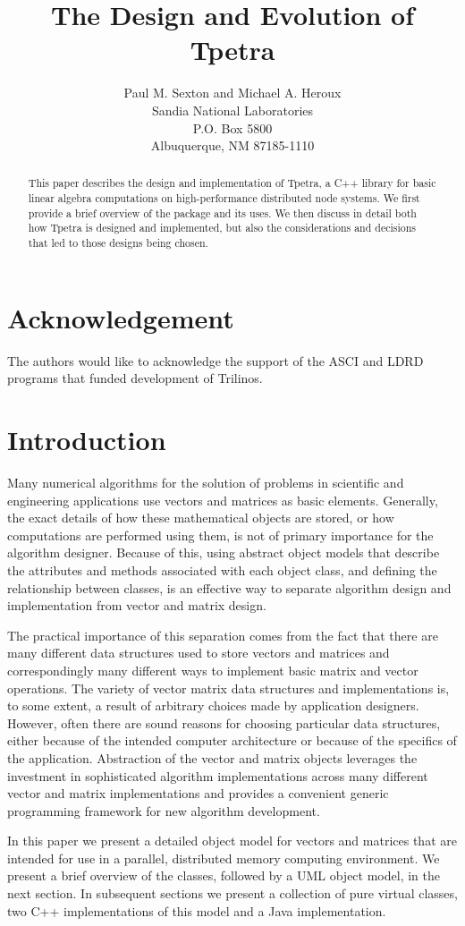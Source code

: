 \documentclass[10pt,relax]{TpetraDesign}
\title{The Design and Evolution of Tpetra}
\author{Paul M. Sexton and Michael A. Heroux \\
       Sandia National Laboratories\\
       P.O. Box 5800\\
       Albuquerque, NM 87185-1110
     }
\date{}
\begin{document}
\maketitle

\begin{abstract}
This paper describes the design and implementation of Tpetra,
a C++ library for basic linear algebra computations on high-performance
distributed node systems. We first provide a brief overview of
the package and its uses. We then discuss in detail both how
Tpetra is designed and implemented, but also the considerations
and decisions that led to those designs being chosen.
\end{abstract}

\clearpage
\section*{Acknowledgement}
The authors would like to acknowledge the support of the ASCI and LDRD programs
that funded development of Trilinos.

\newpage

\section{Introduction}


Many numerical algorithms for the solution of problems in
scientific and engineering applications use vectors and
matrices as basic elements.   Generally, the exact details
of how these mathematical objects are stored, or how computations
are performed using them, is not of primary importance for the
algorithm designer.  Because of this, using abstract object models
that describe the attributes and methods associated with each
object class, and defining the relationship between classes, is an
effective way to separate algorithm design and implementation from
vector and matrix design.

The practical importance of this separation comes from the fact
that there are many different data structures used to store
vectors and matrices and correspondingly many different ways
to implement basic matrix and vector operations.  The variety
of vector matrix data structures and implementations is, to
some extent, a result of arbitrary choices made by application
designers.  However, often there are sound reasons for choosing
particular data structures, either because of the intended
computer architecture or because of the specifics of the
application.  Abstraction of the vector and matrix objects
leverages the investment in sophisticated algorithm implementations
across many different vector and matrix implementations and
provides a convenient generic programming framework for new
algorithm development.

In this paper we present a detailed object model for vectors
and matrices that are intended for use in a parallel, distributed
memory computing environment.  We present a brief overview of
the classes, followed by a UML object model, in the next section.
In subsequent sections we present a collection of pure virtual
classes, two C++ implementations of this model and a Java
implementation.
\end{document}

